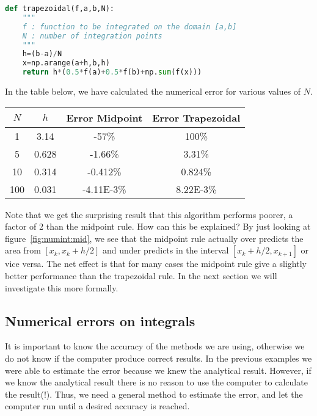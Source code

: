 \documentclass[graybox,sectrefs,envcountresetchap,open=right,final]{svmonodo}
\begin{document}
\begin{lstlisting}[language=python,style=blue1]
def trapezoidal(f,a,b,N):
    """
    f : function to be integrated on the domain [a,b]
    N : number of integration points
    """
    h=(b-a)/N
    x=np.arange(a+h,b,h)
    return h*(0.5*f(a)+0.5*f(b)+np.sum(f(x)))

\end{lstlisting}


In the table below, we have calculated the numerical error for various values of $N$.



{\small   %

\vspace{4mm}

\begin{tabular}{cccc}
\hline
\multicolumn{1}{c}{ $N$ } & \multicolumn{1}{c}{ $h$ } & \multicolumn{1}{c}{ Error Midpoint } & \multicolumn{1}{c}{ Error Trapezoidal } \\
\hline
1   & 3.14  & -57\%          & 100\%             \\
5   & 0.628 & -1.66\%        & 3.31\%            \\
10  & 0.314 & -0.412\%       & 0.824\%           \\
100 & 0.031 & -4.11E-3\%     & 8.22E-3\%         \\
\hline
\end{tabular}

\vspace{4mm}

}


\noindent
Note that we get the surprising result that this algorithm performs poorer, a factor of 2 than the midpoint rule.
How can this be explained? By just looking at figure~\ref{fig:numint:mid}, we see that the midpoint rule actually over predicts the area from $[x_k,x_k+h/2]$ 
 and under predicts in the interval $[x_k+h/2,x_{k+1}]$ or vice versa. The net effect is that for many cases the midpoint rule give a slightly better 
 performance than the trapezoidal rule. In the next section we will investigate this more formally.

\subsection{Numerical errors on integrals}
It is important to know the accuracy of the methods we are using, otherwise we do not know if the
computer produce correct results. In the previous examples we were able to estimate the error because we knew the analytical result. However, if we know the 
analytical result there is no reason to use the computer to calculate the result(!). Thus, we need a general method to estimate the error, and let the computer 
run until a desired accuracy is reached. 
\end{document}
